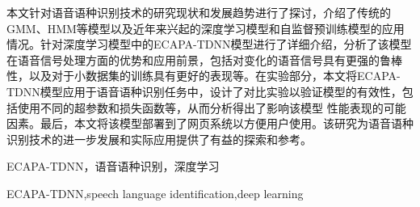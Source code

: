

\begin{zhaiyao}
\begin{spacing}{1.5}
{

本文针对语音语种识别技术的研究现状和发展趋势进行了探讨，介绍了传统的GMM、HMM等模型以及近年来兴起的深度学习模型和自监督预训练模型的应用情况。针对深度学习模型中的ECAPA-TDNN模型进行了详细介绍，分析了该模型在语音信号处理方面的优势和应用前景，包括对变化的语音信号具有更强的鲁棒性，以及对于小数据集的训练具有更好的表现等。在实验部分，本文将ECAPA-TDNN模型应用于语音语种识别任务中，设计了对比实验以验证模型的有效性，包括使用不同的超参数和损失函数等，从而分析得出了影响该模型
性能表现的可能因素。最后，本文将该模型部署到了网页系统以方便用户使用。该研究为语音语种识别技术的进一步发展和实际应用提供了有益的探索和参考。
}
\end{spacing}
\end{zhaiyao}




\begin{guanjianci}
ECAPA-TDNN，语音语种识别，深度学习
\end{guanjianci}



\begin{abstract}
\begin{spacing}{1.5}
This article discusses the research status and development trends of speech language identification technology, including traditional models such as GMM and HMM, as well as recent advances in deep learning models and self-supervised pre-training models. The ECAPA-TDNN model in particular is described in detail, analyzing its advantages and potential applications in speech signal processing, including stronger robustness to changing speech signals and better performance on small datasets. In the experimental section, the ECAPA-TDNN model is applied to speech language identification tasks, and comparative experiments are designed to verify the effectiveness of the model, including the use of different hyperparameters and loss functions, in order to analyze potential factors that affect model performance. Finally, the model is deployed to a web system for ease of use by users. This study provides valuable exploration and reference for the further development and practical application of speech language identification technology.
\end{spacing}
\end{abstract}


\begin{keywords}
ECAPA-TDNN,speech language identification,deep learning
\end{keywords} 
